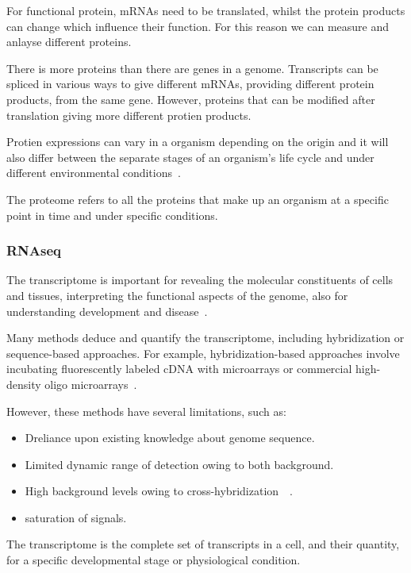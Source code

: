 \documentclass[]{final_report}
\begin{document}
For functional protein, mRNAs need to be translated, whilst the protein products can change which influence their function. For this reason we can measure and anlayse different proteins. 

There is more proteins than there are genes in a genome. Transcripts can be spliced in various ways to give different mRNAs, providing different protein products, from the same gene. However, proteins that can be modified after translation giving more different protien products.

Protien expressions can vary in a organism depending on the origin and it will also differ between the separate stages of an organism’s life cycle and under different environmental conditions~\cite{zvelebil_understanding_2008}.

\begin{definition}[proteome]
    The proteome refers to all the proteins that make up an organism at a specific point in time and under specific conditions.
\end{definition}

\subsubsection{RNAseq}

The transcriptome is important for revealing the molecular constituents of cells and tissues, interpreting the functional aspects of the genome, also for understanding development and disease~\cite{wang_rna-seq_2009}.

Many methods deduce and quantify the transcriptome, including hybridization or sequence-based approaches. For example, hybridization-based approaches involve incubating fluorescently labeled cDNA with microarrays or commercial high-density oligo microarrays~\cite{wang_rna-seq_2009}.

However, these methods have several limitations, such as: 
\begin{itemize}
    \item Dreliance upon existing knowledge about genome sequence.
    \item Limited dynamic range of detection owing to both background.
    \item High background levels owing to cross-hybridization~\cite{okoniewski_hybridization_2006}~\cite{royce_toward_2007}.
    \item saturation of signals.
\end{itemize}

\begin{definition}[transcriptome]
    The transcriptome is the complete set of transcripts in a cell, and their quantity, for a specific developmental stage or physiological condition. 
\end{definition}
\end{document}
